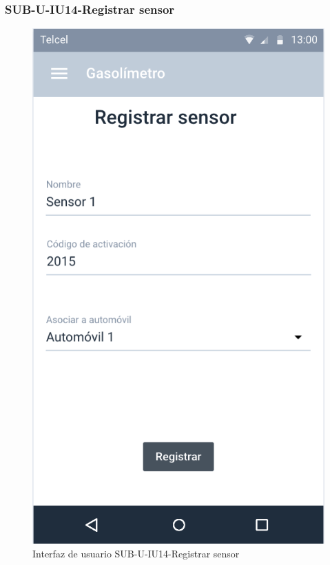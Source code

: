 \subsubsection{SUB-U-IU14-Registrar sensor}\label{SUB-U-IU14}
\begin{figure}[H]
	\centering
	\includegraphics[scale=1]{Capitulo4/software/submodulos/usuarios/images/sub-u-iu14}
	\caption{Interfaz de usuario SUB-U-IU14-Registrar sensor}
	\label{fig:sub-u-iu14}
\end{figure}